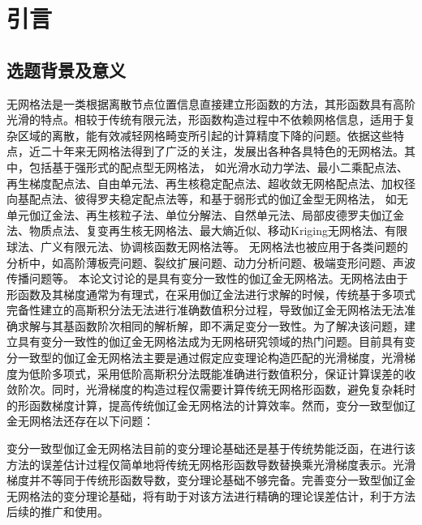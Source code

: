 \chapter{引言}
\section{选题背景及意义}
无网格法\cite{belytschkoMeshlessMethodsOverview1996b,chen2017,zhang2009,liu2009,wang2021b}是一类根据离散节点位置信息直接建立形函数的方法，其形函数具有高阶光滑的特点。相较于传统有限元法\cite{hughes2000, 2014Computer}，形函数构造过程中不依赖网格信息，适用于复杂区域的离散，能有效减轻网格畸变所引起的计算精度下降的问题。依据这些特点，近二十年来无网格法得到了广泛的关注，发展出各种各具特色的无网格法。其中，包括基于强形式的配点型无网格法，
如光滑水动力学法\cite{1977A}、最小二乘配点法\cite{zhang2001}、再生梯度配点法\cite{chi2013}、自由单元法\cite{GaoXiaoWei2019}、再生核稳定配点法\cite{wang2020c}、超收敛无网格配点法\cite{deng2023}、加权径向基配点法\cite{xue2024}、彼得罗夫稳定配点法\cite{wang2022b}等，和基于弱形式的伽辽金型无网格法，
如无单元伽辽金法\cite{belytschko1994}、再生核粒子法\cite{liu1995}、单位分解法\cite{babuska1997}、自然单元法\cite{sukumar1998}、局部皮德罗夫伽辽金法\cite{long2002}、物质点法\cite{LianYanPing2013}、复变再生核无网格法\cite{ChengYuMin2005}、最大熵近似\cite{millan2011}、移动Kriging无网格法\cite{thai2016}、有限球法\cite{de2001}、广义有限元法\cite{strouboulis2001}、协调核函数无网格法\cite{koester2019}等。
无网格法也被应用于各类问题的分析中，如高阶薄板壳问题\cite{chen2015,deng2019,hilali2022,truong2024}、裂纹扩展问题\cite{GaoXin2018,zhu2021,nguyen2024}、动力分析问题\cite{ChenJian2022}、极端变形问题\cite{ZhangXiong2017,yreux2017}、声波传播问题\cite{you2024}等。
本论文讨论的是具有变分一致性的伽辽金无网格法\cite{chen2001,WuJunChao2016}。无网格法由于形函数及其梯度通常为有理式，在采用伽辽金法进行求解的时候，传统基于多项式完备性建立的高斯积分法无法进行准确数值积分过程，导致伽辽金无网格法无法准确求解与其基函数阶次相同的解析解，即不满足变分一致性\cite{1999Numerical, babuska2008, wu2021}。为了解决该问题，建立具有变分一致性的伽辽金无网格法成为无网格研究领域的热门问题。目前具有变分一致型的伽辽金无网格法主要是通过假定应变理论构造匹配的光滑梯度，光滑梯度为低阶多项式，采用低阶高斯积分法既能准确进行数值积分，保证计算误差的收敛阶次。同时，光滑梯度的构造过程仅需要计算传统无网格形函数，避免复杂耗时的形函数梯度计算，提高传统伽辽金无网格法的计算效率\cite{nguyen2008,nagevadiya2019}。然而，变分一致型伽辽金无网格法还存在以下问题：

变分一致型伽辽金无网格法目前的变分理论基础还是基于传统势能泛函，在进行该方法的误差估计过程仅简单地将传统无网格形函数导数替换乘光滑梯度表示\cite{wu2021}。光滑梯度并不等同于传统形函数导数，变分理论基础不够完备。完善变分一致型伽辽金无网格法的变分理论基础，将有助于对该方法进行精确的理论误差估计，利于方法后续的推广和使用。

